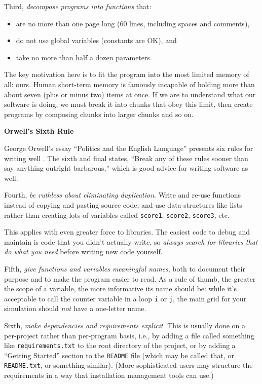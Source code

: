 \documentclass[10pt]{article}
\newcommand{\recommend}[1]{\textit{#1}}
\begin{document}
Third, \recommend{decompose programs into functions} that:

\begin{itemize}
\item
  are no more than one page long (60 lines, including spaces and
  comments),
\item
  do not use global variables (constants are OK), and
\item
  take no more than half a dozen parameters.
\end{itemize}

The key motivation here is to fit the program into the most limited
memory of all: ours. Human short-term memory is famously incapable of
holding more than about seven (plus or minus two) items at once. If we
are to understand what our software is doing, we must break it into
chunks that obey this limit, then create programs by composing chunks
into larger chunks and so on.

\begin{framed}
\noindent \textbf{Orwell's Sixth Rule}

George Orwell's essay ``Politics and the English Language''
presents six rules for writing well \cite{orwell2002}.
The sixth and final states,
``Break any of these rules sooner than say anything outright barbarous,''
which is good advice for writing software as well.
\end{framed}

Fourth, \recommend{be ruthless about eliminating duplication}. Write and
re-use functions instead of copying and pasting source code, and use
data structures like lists rather than creating lots of variables called
\texttt{score1}, \texttt{score2}, \texttt{score3}, etc.

This applies with even greater force to libraries. The easiest code
to debug and maintain is code that you didn't actually write, so
\emph{always search for libraries that do what you need} before writing
new code yourself.

Fifth, \recommend{give functions and variables meaningful names}, both to
document their purpose and to make the program easier to read. As a rule
of thumb, the greater the scope of a variable, the more informative its
name should be: while it's acceptable to call the counter variable in a
loop \texttt{i} or \texttt{j}, the main grid for your simulation should
\emph{not} have a one-letter name.

Sixth, \recommend{make dependencies and requirements explicit}. This is
usually done on a per-project rather than per-program basis, i.e., by
adding a file called something like \texttt{requirements.txt} to the
root directory of the project, or by adding a ``Getting Started''
section to the \texttt{README} file (which may be called that, or
\texttt{README.txt}, or something similar). (More sophisticated users may
structure the requirements in a way that installation management tools
can use.)
\end{document}
